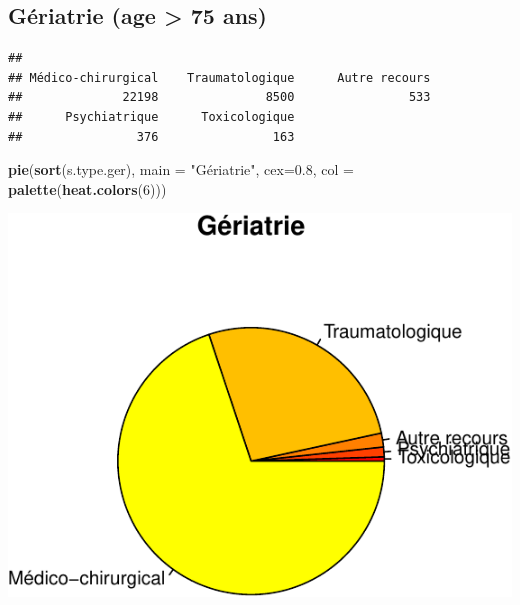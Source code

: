 \documentclass[]{article}
\newenvironment{Shaded}{\begin{snugshade}}{\end{snugshade}}
\newcommand{\KeywordTok}[1]{\textcolor[rgb]{0.13,0.29,0.53}{\textbf{{#1}}}}
\newcommand{\DataTypeTok}[1]{\textcolor[rgb]{0.13,0.29,0.53}{{#1}}}
\newcommand{\DecValTok}[1]{\textcolor[rgb]{0.00,0.00,0.81}{{#1}}}
\newcommand{\FloatTok}[1]{\textcolor[rgb]{0.00,0.00,0.81}{{#1}}}
\newcommand{\StringTok}[1]{\textcolor[rgb]{0.31,0.60,0.02}{{#1}}}
\newcommand{\OtherTok}[1]{\textcolor[rgb]{0.56,0.35,0.01}{{#1}}}
\newcommand{\NormalTok}[1]{{#1}}
\begin{document}
\subsection{Gériatrie (age \textgreater{} 75
ans)}\label{geriatrie-age-75-ans}

\begin{Shaded}
\end{Shaded}

\begin{verbatim}
## 
## Médico-chirurgical    Traumatologique      Autre recours 
##              22198               8500                533 
##      Psychiatrique      Toxicologique 
##                376                163
\end{verbatim}

\begin{Shaded}
\begin{Highlighting}[]
\KeywordTok{pie}\NormalTok{(}\KeywordTok{sort}\NormalTok{(s.type.ger), }\DataTypeTok{main =} \StringTok{"Gériatrie"}\NormalTok{, }\DataTypeTok{cex=}\FloatTok{0.8}\NormalTok{, }\DataTypeTok{col =} \KeywordTok{palette}\NormalTok{(}\KeywordTok{heat.colors}\NormalTok{(}\DecValTok{6}\NormalTok{)))}
\end{Highlighting}
\end{Shaded}

\includegraphics{analyse_merge_files/figure-latex/geriatrie-1.pdf}
\end{document}
